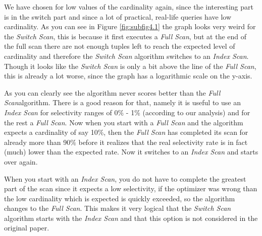 \documentclass[a4paper,11pt,twoside]{article}
\begin{document}
We have chosen for low values of the cardinality again, since the interesting part is in the switch part and since a lot of practical, real-life queries have low cardinality. As you can see in Figure \autoref{fig:subfig4.1} the graph looks very weird for the \textit{Switch Scan}, this is because it first executes a \textit{Full Scan}, but at the end of the full scan there are not enough tuples left to reach the expected level of cardinality and therefore the \textit{Switch Scan} algorithm switches to an \textit{Index Scan}. Though it looks like the \textit{Switch Scan} is only a bit above the line of the \textit{Full Scan}, this is already a lot worse, since the graph has a logarithmic scale on the y-axis.

As you can clearly see the algorithm never scores better than the \textit{Full Scan}algorithm. There is a good reason for that, namely it is useful to use an \textit{Index Scan} for selectivity ranges of 0$\%$ - 1$\%$ (according to our analysis) and for the rest a \textit{Full Scan}. Now when you start with a \textit{Full Scan} and the algorithm expects a cardinality of say 10$\%$, then the \textit{Full Scan} has completed its scan for already more than 90$\%$ before it realizes that the real selectivity rate is in fact (much) lower than the expected rate. Now it switches to an \textit{Index Scan} and starts over again. 

When you start with an \textit{Index Scan}, you do not have to complete the greatest part of the scan since it expects a low selectivity, if the optimizer was wrong than the low cardinality which is expected is quickly exceeded, so the algorithm changes to the \textit{Full Scan}. This makes it very logical that the \textit{Switch Scan} algorithm starts with the \textit{Index Scan} and that this option is not considered in the original paper.
\end{document}
